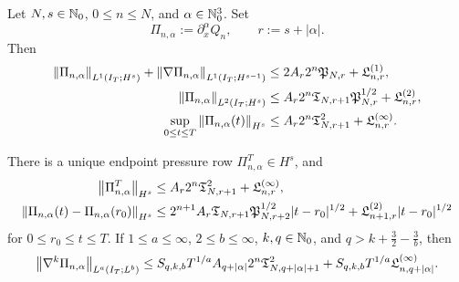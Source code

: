 \begin{theorem}
\label{f:thm:qc-pressure-rows}
\begin{samepage}
Let \(N,s\in\mathbb N_0\), \(0\le n\le N\), and
\(\alpha\in\mathbb N_0^3\).  Set
\[
 \Pi_{n,\alpha}:=\partial_x^\alpha Q_n,
 \qquad r:=s+|\alpha|.
\]
Then
\begin{align}
 \left\lVert \Pi_{n,\alpha}\right\rVert_{L^1(I_T;H^s)}
 +\left\lVert \nabla\Pi_{n,\alpha}\right\rVert_{L^1(I_T;H^{s-1})}
 &\le 2A_r2^n\mathfrak P_{N,r}+\mathfrak L^{(1)}_{n,r},
 \label{f:eq:qc-pressure-l1}\\
 \left\lVert \Pi_{n,\alpha}\right\rVert_{L^2(I_T;H^s)}
 &\le A_r2^n
 \mathfrak T_{N,r+1}\mathfrak P_{N,r}^{1/2}
 +\mathfrak L^{(2)}_{n,r},
 \label{f:eq:qc-pressure-l2}\\
 \sup_{0\le t\le T}\left\lVert \Pi_{n,\alpha}(t)\right\rVert_{H^s}
 &\le A_r2^n\mathfrak T_{N,r+1}^2
 +\mathfrak L^{(\infty)}_{n,r}.
 \label{f:eq:qc-pressure-sup}
\end{align}
\end{samepage}
There is a unique endpoint pressure row \(\Pi_{n,\alpha}^T\in H^s\), and
\begin{align}
 \left\lVert \Pi_{n,\alpha}^T\right\rVert_{H^s}
 &\le A_r2^n\mathfrak T_{N,r+1}^2
 +\mathfrak L^{(\infty)}_{n,r},
 \label{f:eq:qc-pressure-endpoint}\\
 \left\lVert \Pi_{n,\alpha}(t)-\Pi_{n,\alpha}(r_0)\right\rVert_{H^s}
 &\le 2^{n+1}A_r\mathfrak T_{N,r+1}
 \mathfrak P_{N,r+2}^{1/2}|t-r_0|^{1/2}
 +\mathfrak L^{(2)}_{n+1,r}|t-r_0|^{1/2}
 \label{f:eq:qc-pressure-modulus}
\end{align}
for \(0\le r_0\le t\le T\).  If
\(1\le a\le\infty\), \(2\le b\le\infty\),
\(k,q\in\mathbb N_0\), and
\(q>k+\frac32-\frac3b\), then
\begin{equation}
 \left\lVert \nabla^k\Pi_{n,\alpha}\right\rVert_{L^a(I_T;L^b)}
 \le
 S_{q,k,b}T^{1/a}A_{q+|\alpha|}2^n
 \mathfrak T_{N,q+|\alpha|+1}^2
 +S_{q,k,b}T^{1/a}\mathfrak L^{(\infty)}_{n,q+|\alpha|}.
 \label{f:eq:qc-pressure-la-lb}
\end{equation}
\end{theorem}

